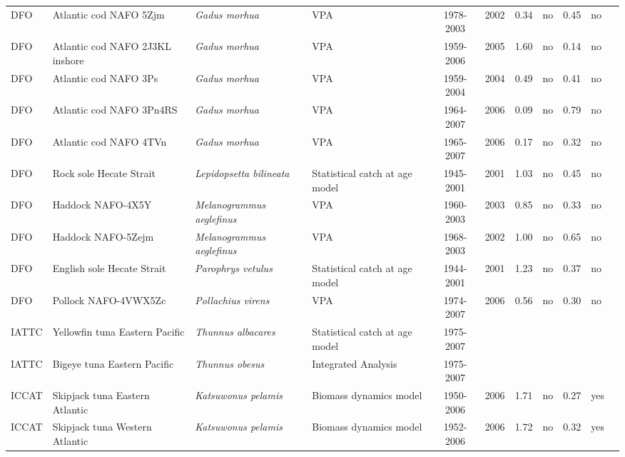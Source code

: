 \begin{longtable}{p{1.8cm}p{3.5cm}p{3.5cm}p{3cm}cccp{0.9cm}cp{0.9cm}c}
  DFO & Atlantic cod NAFO 5Zjm & \textit{Gadus morhua} & VPA & 1978-2003 & 2002 & 0.34 & no & 0.45 & no & \cite{NAFO-COD5Zjm-2003.pdf} \\ 
  DFO & Atlantic cod NAFO 2J3KL inshore & \textit{Gadus morhua} & VPA & 1959-2006 & 2005 & 1.60 & no & 0.14 & no & \cite{DFO-COD2J3KLIS-2006.pdf} \\ 
  DFO & Atlantic cod NAFO 3Ps & \textit{Gadus morhua} & VPA & 1959-2004 & 2004 & 0.49 & no & 0.41 & no & \cite{DFO-COD3Ps-2004.pdf} \\ 
  DFO & Atlantic cod NAFO 3Pn4RS & \textit{Gadus morhua} & VPA & 1964-2007 & 2006 & 0.09 & no & 0.79 & no & \cite{DFO-COD3Pn4Rs-2007.pdf} \\ 
  DFO & Atlantic cod NAFO 4TVn & \textit{Gadus morhua} & VPA & 1965-2007 & 2006 & 0.17 & no & 0.32 & no & \cite{NAFO-COD4TVn-2007.pdf} \\ 
  DFO & Rock sole Hecate Strait & \textit{Lepidopsetta bilineata} & Statistical catch at age model & 1945-2001 & 2001 & 1.03 & no & 0.45 & no & \cite{Flat99.pdf} \\ 
  DFO & Haddock NAFO-4X5Y & \textit{Melanogrammus aeglefinus} & VPA & 1960-2003 & 2003 & 0.85 & no & 0.33 & no & \cite{NAFO-HAD4X5Y-2003.pdf} \\ 
  DFO & Haddock NAFO-5Zejm & \textit{Melanogrammus aeglefinus} & VPA & 1968-2003 & 2002 & 1.00 & no & 0.65 & no & \cite{NAFO-HAD5Zejm-2003.pdf} \\ 
  DFO & English sole Hecate Strait & \textit{Parophrys vetulus} & Statistical catch at age model & 1944-2001 & 2001 & 1.23 & no & 0.37 & no & \cite{Flat99.pdf} \\ 
  DFO & Pollock NAFO-4VWX5Zc & \textit{Pollachius virens} & VPA & 1974-2007 & 2006 & 0.56 & no & 0.30 & no & \cite{NAFO-POLL4VWX5Zc-2006.pdf} \\ 
  IATTC & Yellowfin tuna Eastern Pacific & \textit{Thunnus albacares} & Statistical catch at age model & 1975-2007 &  &  &  &  &  & \cite{SAR8-YFT-ENG.pdf} \\ 
  IATTC & Bigeye tuna Eastern Pacific & \textit{Thunnus obesus} & Integrated Analysis & 1975-2007 &  &  &  &  &  & \cite{JENSEN_BETEPAC_2008.pdf} \\ 
  ICCAT & Skipjack tuna Eastern Atlantic & \textit{Katsuwonus pelamis} & Biomass dynamics model & 1950-2006 & 2006 & 1.71 & no & 0.27 & yes & \cite{JENSEN-YFINATL-2008.pdf} \\ 
  ICCAT & Skipjack tuna Western Atlantic & \textit{Katsuwonus pelamis} & Biomass dynamics model & 1952-2006 & 2006 & 1.72 & no & 0.32 & yes & \cite{JENSEN-YFINATL-2008.pdf} \\ 

\end{longtable}
